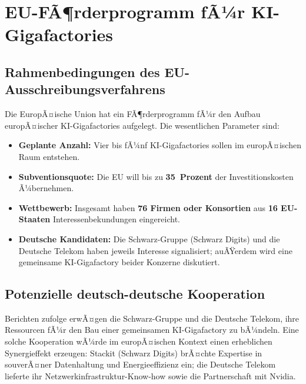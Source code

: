 ﻿\documentclass[12pt, a4paper, openany]{report}
\begin{document}
\section{EU-FÃ¶rderprogramm fÃ¼r KI-Gigafactories}
\label{sec:eu_gigafactory}

\subsection{Rahmenbedingungen des EU-Ausschreibungsverfahrens}

Die EuropÃ¤ische Union hat ein FÃ¶rderprogramm fÃ¼r den Aufbau europÃ¤ischer
KI-Gigafac\-tories aufgelegt. Die wesentlichen Parameter sind:

\begin{itemize}[leftmargin=2em]
	\item \textbf{Geplante Anzahl:} Vier bis fÃ¼nf KI-Gigafac\-tories sollen im
	europÃ¤ischen Raum entstehen.
	\item \textbf{Subventionsquote:} Die EU will bis zu \textbf{35~Prozent}
	der Investitionskosten Ã¼bernehmen.
	\item \textbf{Wettbewerb:} Insgesamt haben \textbf{76 Firmen oder Konsortien}
	aus \textbf{16 EU-Staaten} Interessenbekundungen eingereicht.
	\item \textbf{Deutsche Kandidaten:} Die Schwarz-Gruppe (Schwarz Digits)
	und die Deutsche Telekom haben jeweils Interesse signalisiert;
	auÃŸerdem wird eine gemeinsame KI-Gigafactory beider Konzerne diskutiert.
\end{itemize}

\subsection{Potenzielle deutsch-deutsche Kooperation}

Berichten zufolge erwÃ¤gen die Schwarz-Gruppe und die Deutsche Telekom,
ihre Ressourcen fÃ¼r den Bau einer gemeinsamen KI-Gigafactory zu bÃ¼ndeln.
Eine solche Kooperation wÃ¼rde im europÃ¤ischen Kontext einen erheblichen
Synergieffekt erzeugen: Stackit (Schwarz Digits) brÃ¤chte Expertise in
souverÃ¤ner Datenhaltung und Energieeffizienz ein; die Deutsche Telekom
lieferte ihr Netzwerkinfrastruktur-Know-how sowie die Partnerschaft
mit Nvidia.
\end{document}
